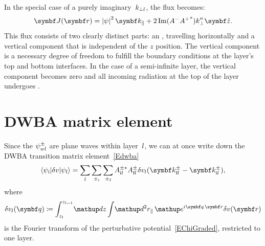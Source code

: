 In the special case of a purely imaginary~$k_{\perp l}$,
the flux becomes:
\begin{equation}
  \v{J}(\r) = \left| \psi \right|^2 \k_\plll + 2 \Im (A^-{A^+}^*) k_\perp''\v{\hat z}.
\end{equation}
This flux consists of two clearly distinct parts: an ,
%
travelling horizontally
 and a vertical component that is independent of the $z$ position. The vertical component is a necessary
 degree of freedom to fulfill the boundary conditions at the layer's top and bottom interfaces.
In the case of a semi-infinite layer, the vertical component becomes zero and
 all incoming radiation at the top of the layer undergoes .
%
\section{DWBA matrix element}

Since the $\psi^\pm_{wl}$ are plane waves within layer~$l$,
we can at once write down the DWBA transition matrix element~\cref{Edwba}
%
\begin{equation}\label{Edwba_ml0}
  \bra \psi_\ti|\delta v|\psi_\tf\ket
  = \sum_{\il} \sum_{\pm_\ti} \sum_{\pm_\tf}
    A^{\pm *}_{\ti \il} A^\pm_{\tf \il}
     \delta v_\il(\k^\pm_{\tf \il}-\k^\pm_{\ti \il}),
\end{equation}
where
\begin{equation}\label{Echij}
  \delta v_\il(\v{q})
  \coloneqq  \int_{z_\il}^{z_{\il-1}}\!\d z \int\!\d^2r_\plll\, \e^{i\v{q}\,\r}\delta v(\r)
\end{equation}
%
is the Fourier transform
of the perturbative potential~\cref{EChiGraded},
restricted to one layer.

